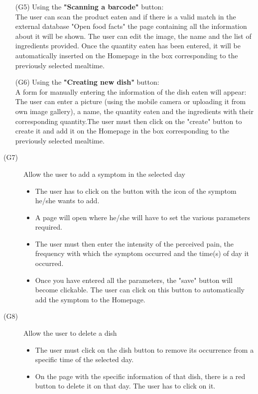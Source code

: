 \documentclass [12pt]{article}
\begin{document}
\begin{description}
\begin{itemize}
\item[(G5)] Using the \textbf{"Scanning a barcode"} button:\\
The user can scan the product eaten and if there is a valid match in the external database "Open food facts" the page containing all the information about it will be shown.  The user can edit the image, the name and the list of ingredients provided. Once the quantity eaten has been entered, it will be automatically inserted on the Homepage in the box corresponding to the previously selected mealtime.
\item[(G6)] Using the \textbf{"Creating new dish"} button:\\
A form for manually entering the information of the dish eaten will appear: 
The user can enter a picture (using the mobile camera or uploading it from own image gallery), a name, the quantity eaten and the ingredients with their corresponding quantity.The user must then click on the "create" button to create it and add it on the Homepage in the box corresponding to the previously selected mealtime. 
\end{itemize}
\end{description}

\begin{description}
\item[(G7)]Allow the user to add a symptom in the selected day
\begin{itemize}
\item The user has to click on the button with the icon of the symptom he/she wants to add. 
\item A page will open where he/she will have to set the various parameters required. 
\item The user must then enter the intensity of the perceived pain, the frequency with which the symptom occurred and the time(s) of day it occurred. 
\item Once you have entered all the parameters, the "save" button will become clickable. The user can click on this button to automatically add the symptom to the Homepage.
\end{itemize}
\end{description}

\begin{description}
\item[(G8)]Allow the user to delete a dish
\begin{itemize}
\item The user must click on the dish button to remove its occurrence from a specific time of the selected day. 
\item On the page with the specific information of that dish, there is a red button to delete it on that day. The user has to click on it.
\end{itemize}
\end{description}
\end{document}
